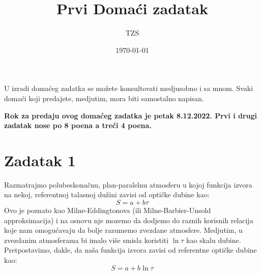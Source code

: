 \documentclass[12pt]{article}
\title{Prvi Doma\'{c}i zadatak}
\author{TZS}
\date{\today}
\begin{document}
\maketitle

U izradi doma\'{c}eg zadatka se mo\v{z}ete konsultovati medjusobno i sa mnom. Svaki doma\'{c}i koji predajete, medjutim, mora biti samostalno napisan. 

\textbf{Rok za predaju ovog doma\'{c}eg zadatka je petak 8.12.2022. Prvi i drugi zadatak nose po 8 poena a tre\'{c}i 4 poena.}

\section*{Zadatak 1}

Razmatrajmo polubeskona\v{c}nu, plan-paralelnu atmosferu u kojoj funkcija izvora na nekoj, referentnoj talasnoj du\v{z}ini zavisi od opti\v{c}ke dubine kao:
\begin{equation}
S = a + b\tau
\end{equation}
Ovo je poznato kao Milne-Eddingtonova (ili Milne-Barbier-Unsold approksimacija) i na osnovu nje mozemo da dodjemo do raznih korisnih relacija koje nam omogu\'{c}avaju da bolje razumemo zvezdane atmosfere. Medjutim, u zvezdanim atmosferama bi imalo vi\v{s}e smisla koristiti $\ln \tau$ kao skalu dubine. Pretpostavimo, dakle, da na\v{s}a funkcija izvora zavisi od referentne opti\v{c}ke dubine kao:
\begin{equation}
S = a + b\ln\tau
\end{equation}
\end{document}
